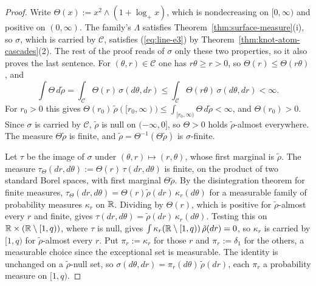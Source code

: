 \begin{proof}
\leanok
{}
Write $\Theta(x) := x^2 \wedge (1 + \log_+x)$, which is nondecreasing on $[0,\infty)$ and positive on
$(0,\infty)$. The family's $\Lambda$ satisfies Theorem~\ref{thm:surface-measure}(i), so $\sigma$,
which is carried by $\mathcal{C}$, satisfies (\ref{eq:line-e3}) by Theorem~\ref{thm:knot-atom-cascades}(2).
The rest of the proof reads of $\sigma$ only these two properties, so it also proves the last
sentence. For $(\theta, r) \in \mathcal{C}$ one has $r\theta \ge r > 0$, so $\Theta(r) \le \Theta(r\theta)$, and
\[
  \int \Theta\,d\tilde\rho = \int_{\mathcal{C}}\Theta(r)\,\sigma(d\theta,dr)
  \le \int_{\mathcal{C}}\Theta(r\theta)\,\sigma(d\theta,dr) < \infty .
\]
For $r_0 > 0$ this gives $\Theta(r_0)\,\tilde\rho([r_0,\infty)) \le \int_{[r_0,\infty)}\Theta\,d\tilde\rho < \infty$,
and $\Theta(r_0) > 0$. Since $\sigma$ is carried by $\mathcal{C}$, $\tilde\rho$ is null on $(-\infty,0]$,
so $\Theta > 0$ holds $\tilde\rho$-almost everywhere. The measure $\Theta\tilde\rho$ is finite, and
$\tilde\rho = \Theta^{-1}(\Theta\tilde\rho)$ is $\sigma$-finite.

Let $\tau$ be the image of $\sigma$ under $(\theta, r) \mapsto (r, \theta)$, whose first marginal
is $\tilde\rho$. The measure $\tau_\Theta(dr, d\theta) := \Theta(r)\,\tau(dr, d\theta)$ is finite, on the
product of two standard Borel spaces, with first marginal $\Theta\tilde\rho$. By the disintegration
theorem for finite measures, $\tau_\Theta(dr, d\theta) = \Theta(r)\tilde\rho(dr)\,\kappa_r(d\theta)$ for a
measurable family of probability measures $\kappa_r$ on $\mathbb{R}$. Dividing by $\Theta(r)$, which is positive
for $\tilde\rho$-almost every $r$ and finite, gives $\tau(dr, d\theta) = \tilde\rho(dr)\,\kappa_r(d\theta)$.
Testing this on $\mathbb{R} \times (\mathbb{R} \setminus [1,q))$, where $\tau$ is null, gives
$\int\kappa_r(\mathbb{R} \setminus [1,q))\,\tilde\rho(dr) = 0$, so $\kappa_r$ is carried by $[1,q)$ for
$\tilde\rho$-almost every $r$. Put $\pi_r := \kappa_r$ for those $r$ and $\pi_r := \delta_1$ for
the others, a measurable choice since the exceptional set is measurable. The identity is unchanged on
a $\tilde\rho$-null set, so $\sigma(d\theta, dr) = \pi_r(d\theta)\,\tilde\rho(dr)$, each $\pi_r$ a
probability measure on $[1,q)$.


\end{proof}
